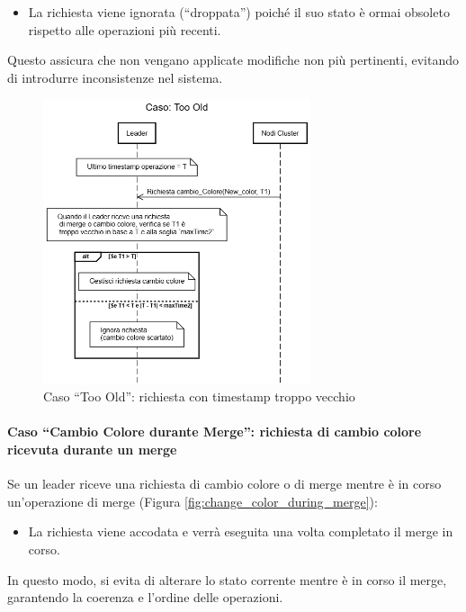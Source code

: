 \documentclass[12pt, a4paper]{report}
\begin{document}
\begin{itemize}
    \item La richiesta viene ignorata (``droppata'') poiché il suo stato \`e ormai obsoleto rispetto alle operazioni più recenti.
\end{itemize}

Questo assicura che non vengano applicate modifiche non più pertinenti, evitando di introdurre inconsistenze nel sistema.

\begin{figure}[H]
    \centering
    \includegraphics[width=0.70\textwidth,align=t]{images/concorrenza/too_old.png}
    \caption{Caso ``Too Old'': richiesta con timestamp troppo vecchio}
    \label{fig:caso_too_old}
\end{figure}

\newpage
\paragraph{Caso ``Cambio Colore durante Merge'': richiesta di cambio colore ricevuta durante un merge}\label{par:change_color_during_merge}

Se un leader riceve una richiesta di cambio colore o di merge mentre \`e in corso un'operazione di merge (Figura \ref{fig:change_color_during_merge}):

\begin{itemize}
    \item La richiesta viene accodata e verrà eseguita una volta completato il merge in corso.
\end{itemize}

In questo modo, si evita di alterare lo stato corrente mentre \`e in corso il merge, garantendo la coerenza e l'ordine delle operazioni.
\end{document}
